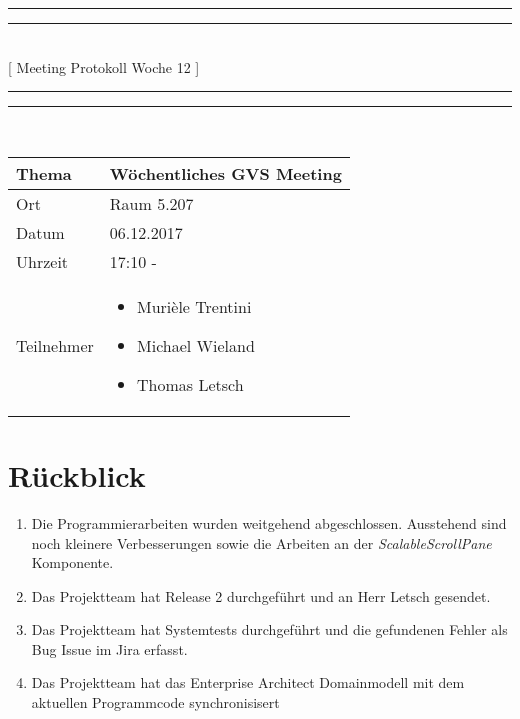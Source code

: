 \documentclass[11pt, a4paper,oneside]{scrartcl}
\begin{document}
	\centering
	\rule{\textwidth}{1.6pt}\vspace*{-\baselineskip}\vspace*{2pt} %
	\rule{\textwidth}{0.4pt}\\[\baselineskip] %
	{\LARGE [ Meeting Protokoll Woche 12 ]}\\[0.2\baselineskip] %
	\rule{\textwidth}{0.4pt}\vspace*{-\baselineskip}\vspace{3.2pt} %
	\rule{\textwidth}{1.6pt}\\[2\baselineskip] %
	
	\begin{tabu} to \linewidth {l X }
		\toprule
		\textbf{Thema} & \textbf{Wöchentliches GVS Meeting} \\
		\midrule
		Ort & Raum 5.207 \\
		Datum & 06.12.2017  \\
		Uhrzeit &  17:10 -  \\
		Teilnehmer & 
		\begin{minipage}[t]{\textwidth}
			\begin{itemize}
				\item Murièle Trentini
				\item Michael Wieland
				\item Thomas Letsch
			\end{itemize}
		\end{minipage}
		\\
		\bottomrule
	\end{tabu}
	
	
	\section{Rückblick}
	\begin{enumerate}
		\item Die Programmierarbeiten wurden weitgehend abgeschlossen. Ausstehend sind noch kleinere Verbesserungen sowie die Arbeiten an der \textit{ScalableScrollPane} Komponente.
		\item Das Projektteam hat Release 2 durchgeführt und an Herr Letsch gesendet.
		\item Das Projektteam hat Systemtests durchgeführt und die gefundenen Fehler als Bug Issue im Jira erfasst.
		\item Das Projektteam hat das Enterprise Architect Domainmodell mit dem aktuellen Programmcode synchronisisert
	\end{enumerate}
	
\end{document}
